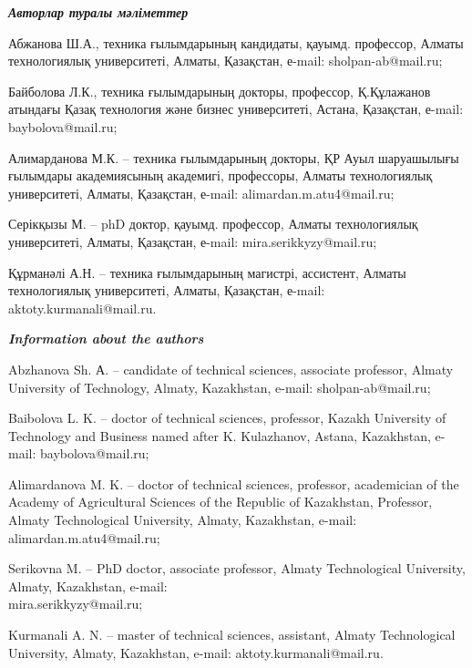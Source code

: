 \begin{authorinfo}
\emph{{\bfseries Авторлар туралы мәліметтер}}  

Абжанова Ш.А., техника ғылымдарының кандидаты, қауымд. профессор,
Алматы технологиялық университеті, Алматы, Қазақстан, е-mail:
sholpan-ab@mail.ru;

Байболова Л.К., техника ғылымдарының докторы, профессор, Қ.Құлажанов
атындағы Қазақ технология және бизнес университеті, Астана, Қазақстан,
е-mail: baybolova@mail.ru;

Алимарданова М.К. – техника ғылымдарының докторы, ҚР Ауыл шаруашылығы
ғылымдары академиясының академигі, профессоры, Алматы технологиялық
университеті, Алматы, Қазақстан, е-mail: alimardan.m.atu4@mail.ru;

Серікқызы М. – phD доктор, қауымд. профессор, Алматы технологиялық
университеті, Алматы, Қазақстан, е-mail: mira.serikkyzy@mail.ru;

Құрманәлі А.Н. – техника ғылымдарының магистрі, ассистент, Алматы
технологиялық университеті, Алматы, Қазақстан, е-mail:
aktoty.kurmanali@mail.ru.

\emph{{\bfseries Information about the authors}}  

Abzhanova Sh. А. – candidate of technical sciences, associate
professor, Almaty University of Technology, Almaty, Kazakhstan,
e-mail: sholpan-ab@mail.ru;

Baibolova L. K. – doctor of technical sciences, professor, Kazakh
University of Technology and Business named after K. Kulazhanov,
Astana, Kazakhstan, e-mail: baybolova@mail.ru;

Alimardanova M. K. – doctor of technical sciences, professor,
academician of the Academy of Agricultural Sciences of the Republic of
Kazakhstan, Professor, Almaty Technological University, Almaty,
Kazakhstan, e-mail: alimardan.m.atu4@mail.ru;

Serikovna M. – PhD doctor, associate professor, Almaty Technological
University, Almaty, Kazakhstan, e-mail: \\mira.serikkyzy@mail.ru;

Kurmanali A. N. – master of technical sciences, assistant, Almaty
Technological University, Almaty, Kazakhstan, e-mail:
aktoty.kurmanali@mail.ru.
\end{authorinfo}
